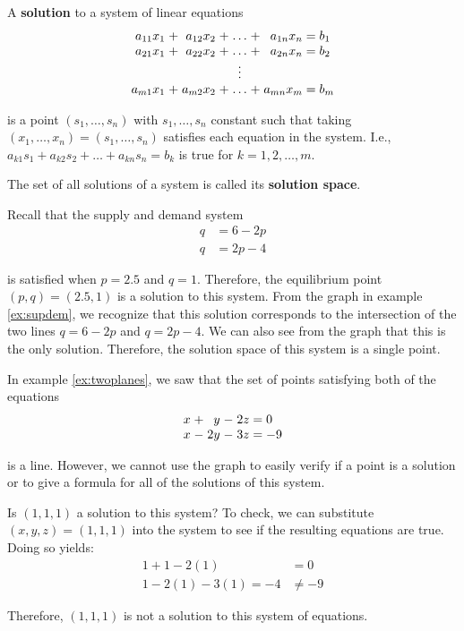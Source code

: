 \begin{definition}
	A \textbf{solution} to a system of linear equations
	\[
	\arraycolsep=1.4pt
	\begin{array}{rcrcccrl}
		a_{11} x_1 &+& a_{12}x_2& +& \dots &+& a_{1n}x_n 	&= b_1\\
		a_{21} x_1 &+& a_{22}x_2& +& \dots &+& a_{2n}x_n 	&= b_2\\
				&	&		&	& \vdots &	&	&	\\
		a_{m1}x_1& +& a_{m2}x_2 &+& \dots &+& a_{mn}x_m &= b_m
	\end{array}
	\]
	
	\noindent is a point $(s_1,\dots, s_n)$ with $s_1,\dots,s_n$ constant such that taking $(x_1,\dots,x_n) = (s_1,\dots,s_n)$ satisfies each equation in the system. I.e., $a_{k1}s_1 + a_{k2}s_2 + \dots + a_{kn}s_n = b_k$ is true for $k = 1, 2, \dots, m$.
	
	The set of all solutions of a system is called its \textbf{solution space}.
\end{definition}

\begin{example}
	Recall that the supply and demand system
	\begin{align*}
		q &= 6-2p\\
		q &= 2p-4
	\end{align*}
	
	\noindent is satisfied when $p = 2.5$ and $q = 1$. Therefore, the equilibrium point $(p,q) = (2.5,1)$ is a solution to this system. From the graph in example \ref{ex:supdem}, we recognize that this solution corresponds to the intersection of the two lines $q = 6-2p$ and $q = 2p-4$. We can also see from the graph that this is the only solution. Therefore, the solution space of this system is a single point.
\end{example}

\begin{example}
	In example \ref{ex:twoplanes}, we saw that the set of points satisfying both of the equations 
	\[
	\arraycolsep=1.4pt
	\begin{array}{rcrcrl}
		x  &+& y &-& 2z &= 0\\
		x &-& 2y &-& 3z &= -9
	\end{array}
	\]
	
	\noindent is a line. However, we cannot use the graph to easily verify if a point is a solution or to give a formula for all of the solutions of this system.
	
	Is $(1,1,1)$ a solution to this system? To check, we can substitute $(x,y,z) = (1,1,1)$ into the system to see if the resulting equations are true. Doing so yields:
	\begin{align*}
		1 + 1 - 2(1) &= 0\\
		1 - 2(1) - 3(1) = -4 &\ne -9
	\end{align*}
	
	Therefore, $(1,1,1)$ is not a solution to this system of equations.

\end{example}

